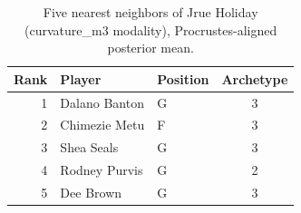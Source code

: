 \begin{table}[htbp]
  \centering\small
  \begin{tabular}{rllc}
    \toprule
    Rank & Player & Position & Archetype \\
    \midrule
    1 & Dalano Banton & G & 3 \\
    2 & Chimezie Metu & F & 3 \\
    3 & Shea Seals & G & 3 \\
    4 & Rodney Purvis & G & 2 \\
    5 & Dee Brown & G & 3 \\
    \bottomrule
  \end{tabular}
  \caption{Five nearest neighbors of Jrue Holiday (curvature_m3 modality), Procrustes-aligned posterior mean.}
  \label{tab:Jrue_Holiday_neighbors_curvature_m3}
\end{table}

